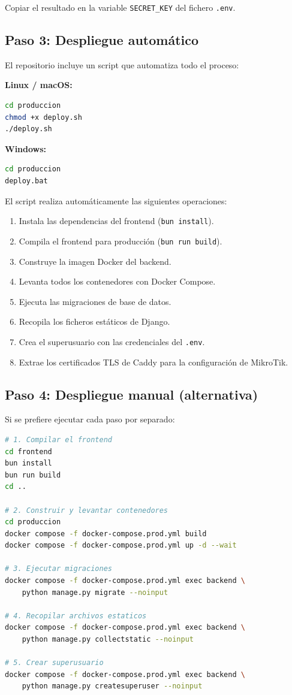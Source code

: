 \documentclass[12pt,a4paper]{article}
\begin{document}
Copiar el resultado en la variable \texttt{SECRET\_KEY} del fichero \texttt{.env}.

\subsection{Paso 3: Despliegue automático}

El repositorio incluye un script que automatiza todo el proceso:

\textbf{Linux / macOS:}
\begin{lstlisting}[language=bash]
cd produccion
chmod +x deploy.sh
./deploy.sh
\end{lstlisting}

\textbf{Windows:}
\begin{lstlisting}[language=bash]
cd produccion
deploy.bat
\end{lstlisting}

El script realiza automáticamente las siguientes operaciones:

\begin{enumerate}
    \item Instala las dependencias del frontend (\texttt{bun install}).
    \item Compila el frontend para producción (\texttt{bun run build}).
    \item Construye la imagen Docker del backend.
    \item Levanta todos los contenedores con Docker Compose.
    \item Ejecuta las migraciones de base de datos.
    \item Recopila los ficheros estáticos de Django.
    \item Crea el superusuario con las credenciales del \texttt{.env}.
    \item Extrae los certificados TLS de Caddy para la configuración de MikroTik.
\end{enumerate}

\subsection{Paso 4: Despliegue manual (alternativa)}

Si se prefiere ejecutar cada paso por separado:

\begin{lstlisting}[language=bash]
# 1. Compilar el frontend
cd frontend
bun install
bun run build
cd ..

# 2. Construir y levantar contenedores
cd produccion
docker compose -f docker-compose.prod.yml build
docker compose -f docker-compose.prod.yml up -d --wait

# 3. Ejecutar migraciones
docker compose -f docker-compose.prod.yml exec backend \
    python manage.py migrate --noinput

# 4. Recopilar archivos estaticos
docker compose -f docker-compose.prod.yml exec backend \
    python manage.py collectstatic --noinput

# 5. Crear superusuario
docker compose -f docker-compose.prod.yml exec backend \
    python manage.py createsuperuser --noinput
\end{lstlisting}
\end{document}
